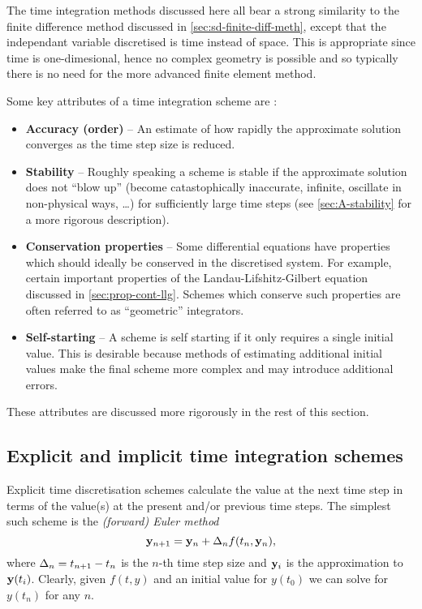 The time integration methods discussed here all bear a strong similarity to the finite difference method discussed in \cref{sec:sd-finite-diff-meth}, except that the independant variable discretised is time instead of space.
This is appropriate since time is one-dimesional, hence no complex geometry is possible and so typically there is no need for the more advanced finite element method.

Some key attributes of a time integration scheme are \cite{Atkinson2009}:
\begin{itemize}
\item \textbf{Accuracy (order)} -- An estimate of how rapidly the approximate solution converges as the time step size is reduced.

\item \textbf{Stability} -- Roughly speaking a scheme is stable if the approximate solution does not ``blow up'' (\ie become catastophically inaccurate, infinite, oscillate in non-physical ways, \ldots) for sufficiently large time steps (see \cref{sec:A-stability} for a more rigorous description).

\item \textbf{Conservation properties} -- Some differential equations have properties which should ideally be conserved in the discretised system.
For example, certain important properties of the Landau-Lifshitz-Gilbert equation discussed in \cref{sec:prop-cont-llg}.
Schemes which conserve such properties are often referred to as ``geometric'' integrators.

\item \textbf{Self-starting} -- A scheme is self starting if it only requires a single initial value.
This is desirable because methods of estimating additional initial values make the final scheme more complex and may introduce additional errors.
\end{itemize}

These attributes are discussed more rigorously in the rest of this section.

\subsection{Explicit and implicit time integration schemes}
\label{sec:explicit-vs-implicit-schemes}

Explicit time discretisation schemes calculate the value at the next time step in terms of the value(s) at the present and/or previous time steps.
The simplest such scheme is the \emph{(forward) Euler method}
\begin{equation}
  \label{eq:44}
  \mathbf{y}_{n+1} = \mathbf{y}_n + \Delta_{n} f(t_n, \mathbf{y}_n),
\end{equation}
where $\Delta_{n} = t_{n+1} - t_n$ is the $n$-th time step size and $\mathbf{y}_i$ is the approximation to $\mathbf{y}(t_i)$.
Clearly, given $f(t,y)$ and an initial value for $y(t_0)$ we can solve for $y(t_n)$ for any $n$.

